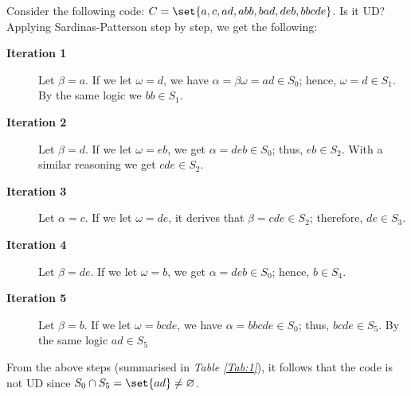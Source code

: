 \documentclass{subfiles}
\begin{document}
    \begin{example*}
        Consider the following code: \(C = \set{a, c, ad, abb, bad, deb, bbcde}\).
        Is it UD? Applying Sardinas-Patterson step by step, we get the following:
        \begin{description}
            \item [\textbf{Iteration 1}] Let \(\beta = a\). 
                If we let \(\omega = d\), we have \(\alpha = \beta\omega = ad \in S_{0}\);
                hence, \(\omega = d \in S_{1}\). By the same logic we \(bb \in S_{1}\). 
            
            \item [\textbf{Iteration 2}] Let \(\beta = d\).
                If we let \(\omega = eb\), we get \(\alpha = deb \in S_{0}\);
                thus, \(eb \in S_{2}\). With a similar reasoning we get \(cde \in S_{2}\).

            \item [\textbf{Iteration 3}] Let \(\alpha = c\).
                If we let \(\omega = de\), it derives that \(\beta = cde \in S_{2}\);
                therefore, \(de \in S_{3}\).

            \item [\textbf{Iteration 4}] Let \(\beta = de\).
                If we let \(\omega = b\), we get \(\alpha = deb \in S_{0}\);
                hence, \(b \in S_{4}\).

            \item [\textbf{Iteration 5}] Let \(\beta = b\).
                If we let \(\omega = bcde\), we have \(\alpha = bbcde \in S_{0}\);
                thus, \(bcde \in S_{5}\). By the same logic \(ad \in S_{5}\) 
        \end{description}

        From the above steps (summarised in \emph{Table \ref{Tab:1}}), 
            it follows that the code is not UD since \(S_{0} \cap S_{5} =
            \set{ad} \ne \varnothing\).
        
    \end{example*}
\end{document}
